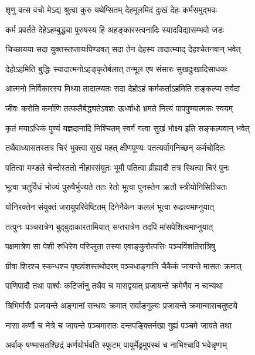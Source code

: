 \twolineshloka
{शृणु वत्स वचो मेऽद्य श्रुत्वा कुरु यथेप्सितम्}
{देहमूलमिदं दुःखं देहः कर्मसमुद्भवः} %

\twolineshloka
{कर्म प्रवर्तते देहेऽहम्बुद्ध्या पुरुषस्य हि}
{अहङ्कारस्त्वनादिः स्यादविद्यासम्भवो जडः} %

\twolineshloka
{चिच्छायया सदा युक्तस्तप्तायःपिण्डवत् सदा}
{तेन देहस्य तादात्म्याद् देहश्चेतनवान् भवेत्} %

\twolineshloka
{देहोऽहमिति बुद्धिः स्यादात्मनोऽहङ्कृतेर्बलात्}
{तन्मूल एष संसारः सुखदुःखादिसाधकः} %

\twolineshloka
{आत्मनो निर्विकारस्य मिथ्या तादात्म्यतः सदा}
{देहोऽहं कर्मकर्ताऽहमिति सङ्कल्प्य सर्वदा} %

\twolineshloka
{जीवः करोति कर्माणि तत्फलैर्बद्ध्यतेऽवशः}
{ऊर्ध्वाधो भ्रमते नित्यं पापपुण्यात्मकः स्वयम्} %

\twolineshloka
{कृतं मयाऽधिकं पुण्यं यज्ञदानादि निश्चितम्}
{स्वर्गं गत्वा सुखं भोक्ष्य इति सङ्कल्पवान् भवेत्} %

\twolineshloka
{तथैवाध्यासतस्तत्र चिरं भुक्त्वा सुखं महत्}
{क्षीणपुण्यः पतत्यर्वागनिच्छन् कर्मचोदितः} %

\twolineshloka
{पतित्वा मण्डले चेन्दोस्ततो नीहारसंयुतः}
{भूमौ पतित्वा व्रीह्यादौ तत्र स्थित्वा चिरं पुनः} %

\twolineshloka
{भूत्वा चतुर्विधं भोज्यं पुरुषैर्भुज्यते ततः}
{रेतो भूत्वा पुनस्तेन ऋतौ स्त्रीयोनिसिञ्चितः} %

\twolineshloka
{योनिरक्तेन संयुक्तं जरायुपरिवेष्टितम्}
{दिनेनैकेन कललं भूत्वा रूढत्वमाप्नुयात्} %

\twolineshloka
{तत्पुनः पञ्चरात्रेण बुद्बुदाकारतामियात्}
{सप्तरात्रेण तदपि मांसपेशित्वमाप्नुयात्} %

\twolineshloka
{पक्षमात्रेण सा पेशी रुधिरेण परिप्लुता}
{तस्या एवाङ्कुरोत्पत्तिः पञ्चविंशतिरात्रिषु} %

\twolineshloka
{ग्रीवा शिरश्च स्कन्धश्च पृष्ठवंशस्तथोदरम्}
{पञ्चधाङ्गानि चैकैकं जायन्ते मासतः क्रमात्} %

\twolineshloka
{पाणिपादौ तथा पार्श्वः कटिर्जानु तथैव च}
{मासद्वयात् प्रजायन्ते क्रमेणैव न चान्यथा} %

\twolineshloka
{त्रिभिर्मासैः प्रजायन्ते अङ्गानां सन्धयः क्रमात्}
{सर्वाङ्गुल्यः प्रजायन्ते क्रमान्मासचतुष्टये} %

\twolineshloka
{नासा कर्णौ च नेत्रे च जायन्ते पञ्चमासतः}
{दन्तपङ्क्तिर्नखा गुह्यं पञ्चमे जायते तथा} %

\twolineshloka
{अर्वाक् षण्मासतश्छिद्रं कर्णयोर्भवति स्फुटम्}
{पायुर्मेढ्रमुपस्थं च नाभिश्चापि भवेन्नृणाम्} %

